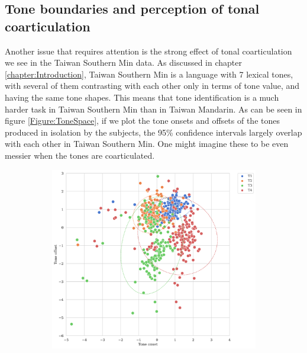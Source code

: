 \documentclass[12pt]{report}
\begin{document}
\begin{CJK}{UTF8}{bsmi}
\section{Tone boundaries and perception of tonal coarticulation}
Another issue that requires attention is the strong effect of tonal coarticulation we see in the Taiwan Southern Min data. As discussed in chapter \ref{chapter:Introduction}, Taiwan Southern Min is a language with 7 lexical tones, with several of them contrasting with each other only in terms of tone value, and having the same tone shapes. This means that tone identification is a much harder task in Taiwan Southern Min than in Taiwan Mandarin. As can be seen in figure \ref{Figure:ToneSpace}, if we plot the tone onsets and offsets of the tones produced in isolation by the subjects, the 95\% confidence intervals largely overlap with each other in Taiwan Southern Min. One might imagine these to be even messier when the tones are coarticulated.
\begin{figure}[hbt!]
\centering
\begin{subfigure}[b]{.8\textwidth}
\centering
\includegraphics[width=\textwidth]{Figures/Tone_space_Mandarin.png}
\end{subfigure}
\begin{subfigure}[b]{.8\textwidth}
\centering

\end{subfigure}
\end{figure}
\end{CJK}
\end{document}
